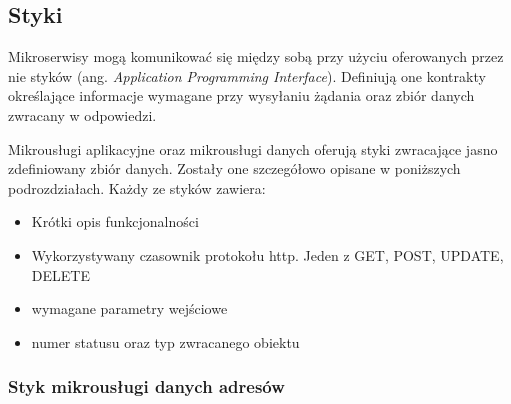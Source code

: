 \subsection{Styki}

Mikroserwisy mogą komunikować się między sobą przy użyciu oferowanych przez nie 
styków (ang. \textit{Application Programming Interface}). Definiują one kontrakty 
określające informacje wymagane przy wysyłaniu żądania oraz zbiór danych zwracany 
w odpowiedzi.

Mikrousługi aplikacyjne oraz mikrousługi danych oferują styki zwracające jasno 
zdefiniowany zbiór danych. Zostały one szczegółowo opisane w poniższych podrozdziałach. 
Każdy ze styków zawiera:

\begin{itemize} %
    \item Krótki opis funkcjonalności
    \item Wykorzystywany czasownik protokołu http. Jeden z GET, POST, UPDATE, DELETE
    \item wymagane parametry wejściowe
    \item numer statusu oraz typ zwracanego obiektu
\end{itemize}

\subsubsection{Styk mikrousługi danych adresów}

